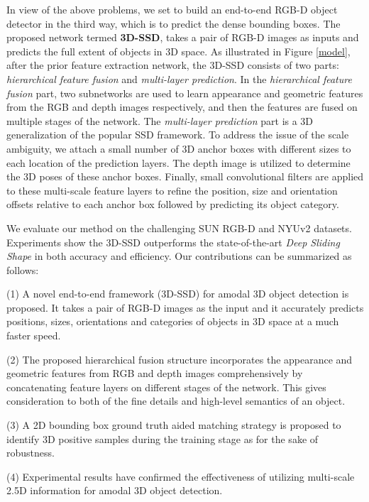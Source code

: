 \documentclass[10pt,twocolumn,letterpaper]{article}
\begin{document}
	In view of the above problems, we set to build an end-to-end RGB-D object detector in the third way, which is to predict the dense bounding boxes. The proposed network termed \textbf{3D-SSD}, takes a pair of RGB-D images as inputs and predicts the full extent of objects in 3D space. As illustrated in Figure \ref{model}, after the prior feature extraction network, the 3D-SSD consists of two parts: \emph{hierarchical feature fusion} and \emph{multi-layer prediction}. In the \emph{hierarchical feature fusion} part, two subnetworks are used to learn appearance and geometric features from the RGB and depth images respectively, and then the features are fused on multiple stages of the network. The \emph{multi-layer prediction} part is a 3D generalization of the popular SSD \cite{Wei2016SSD} framework. 
	To address the issue of the scale ambiguity, we attach a small number of 3D anchor boxes with different sizes to each location of the prediction layers. The depth image is utilized to determine the 3D poses of these anchor boxes. Finally, small convolutional filters are applied to these multi-scale feature layers to refine the position, size and orientation offsets relative to each anchor box followed by predicting its object category. \par
	
	We evaluate our method on the challenging SUN RGB-D and NYUv2 datasets. Experiments show the 3D-SSD outperforms the state-of-the-art \emph{Deep Sliding Shape}\cite{Suran2016DSS} \cite{Deng2017} in both accuracy and efficiency. Our contributions can be summarized as follows:\par 
	(1) A novel end-to-end framework (3D-SSD) for amodal 3D object detection is proposed. It takes a pair of RGB-D images as the input and it accurately predicts positions, sizes, orientations and categories of objects in 3D space at a much faster speed.\par
	
	(2) The proposed hierarchical fusion structure incorporates the appearance and geometric features from RGB and depth images comprehensively by concatenating feature layers on different stages of the network. This gives consideration to both of the fine details  and high-level semantics of an object. \par
	
	(3) A 2D bounding box ground truth aided matching strategy is proposed to identify 3D positive samples during the training stage as for the sake of robustness. \par
	(4) Experimental results have confirmed the effectiveness of utilizing multi-scale 2.5D information for amodal 3D object detection.\par
	
\end{document}
